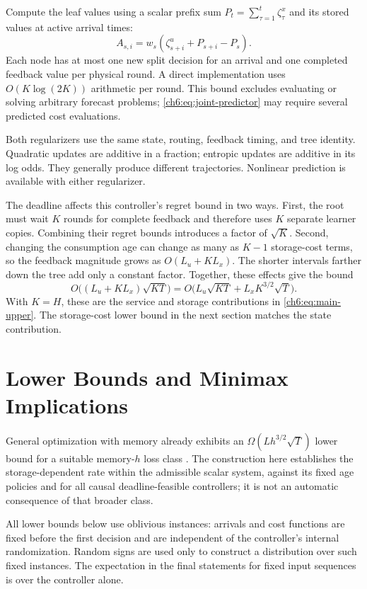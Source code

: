 \documentclass[11pt]{article}
\theoremstyle{plain}
\theoremstyle{remark}
\numberwithin{equation}{section}
\begin{document}
Compute the leaf values using a scalar prefix sum
$P_t=\sum_{\tau=1}^t\zeta_\tau^x$ and its stored values at active arrival times:
\[
 A_{s,i}=w_s(\zeta_{s+i}^u+P_{s+i}-P_s).
\]
Each node has at most one new split decision for an arrival and one completed feedback value per
physical round. A direct implementation uses $O(K\log(2K))$ arithmetic per
round. This bound excludes evaluating or solving arbitrary forecast problems;
\eqref{ch6:eq:joint-predictor} may require several predicted cost evaluations.

Both regularizers use the same state, routing, feedback timing, and tree
identity. Quadratic updates are additive in a fraction; entropic updates are
additive in its log odds. They generally produce different trajectories.
Nonlinear prediction is available with either regularizer.

The deadline affects this controller's regret bound in two ways. First,
the root must wait $K$ rounds for complete feedback and therefore uses
$K$ separate learner copies. Combining their regret bounds introduces a
factor of $\sqrt K$. Second, changing the consumption age can change as
many as $K-1$ storage-cost terms, so the feedback magnitude grows as
$O(L_u+KL_x)$. The shorter intervals farther down the tree add only a
constant factor. Together, these effects give the bound
\[
 O\bigl((L_u+KL_x)\sqrt{KT}\bigr)
 =O\bigl(L_u\sqrt{KT}+L_xK^{3/2}\sqrt T\bigr).
\]
With $K=H$, these are the service and storage contributions in
\eqref{ch6:eq:main-upper}.
The storage-cost lower bound in the next section matches the state contribution.

\section{Lower Bounds and Minimax Implications}
\label{ch6:sec:lower}
General optimization with memory already exhibits an
$\Omega(Lh^{3/2}\sqrt T)$ lower bound for a suitable memory-$h$
loss class \cite[Appendix D]{kumar2023unbounded}. The construction here
establishes the storage-dependent rate within the admissible scalar
system, against its fixed age policies and for all causal deadline-feasible
controllers; it is not an automatic consequence of that broader class.

All lower bounds below use oblivious instances: arrivals and cost functions
are fixed before the first decision and are independent of the controller's internal
randomization. Random signs are used only to construct a distribution over
such fixed instances. The expectation in the final statements for fixed
input sequences is over the controller alone.
\end{document}
